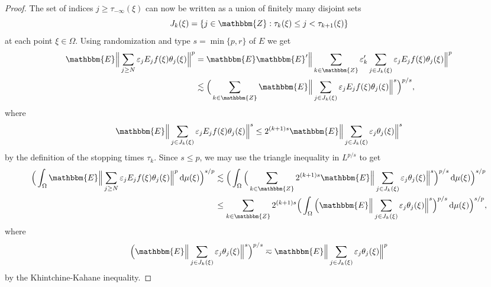 \documentclass[a4paper,10pt]{amsart}
\theoremstyle{plain}
\theoremstyle{definition}
\theoremstyle{remark}
\begin{document}
\begin{proof}
    The set of indices $j\geq\tau_{-\infty}(\xi)$ can now be written as a union of finitely many disjoint sets
    \begin{equation*}
      J_k(\xi) = \{ j\in{\mathbbm{Z}} : \tau_k (\xi) \leq j < \tau_{k+1} (\xi) \}
    \end{equation*} 
    at each point $\xi\in\Omega$.
    Using randomization and type $s = \min \{ p,r \}$ of $E$ we get
    \begin{align*}
      {\mathbbm{E}} \Big\| \sum_{j\geq N} \varepsilon_j E_jf(\xi ) \theta_j(\xi ) \Big\|^p
      &= {\mathbbm{E}} {\mathbbm{E}}' \Big\| \sum_{k\in{\mathbbm{Z}}} \varepsilon_k' \sum_{j\in J_k(\xi)}
        \varepsilon_j E_jf(\xi ) \theta_j(\xi ) \Big\|^p \\
      &\lesssim \Big( \sum_{k\in{\mathbbm{Z}}} {\mathbbm{E}} \Big\| \sum_{j\in J_k(\xi)}
        \varepsilon_j E_jf(\xi ) \theta_j(\xi ) \Big\|^s \Big)^{p/s} ,
    \end{align*}
    where
    \begin{equation*}
      {\mathbbm{E}} \Big\| \sum_{j\in J_k(\xi)}
        \varepsilon_j E_jf(\xi ) \theta_j(\xi ) \Big\|^s
      \leq 2^{(k+1)s} {\mathbbm{E}} \Big\| \sum_{j\in J_k(\xi)}
        \varepsilon_j \theta_j(\xi ) \Big\|^s 
    \end{equation*}
    by the definition of the stopping times $\tau_k$. Since $s\leq p$, we may use the triangle inequality in $L^{p/s}$ to get
    \begin{align*}
      \Big( \int_{\Omega} {\mathbbm{E}} \Big\| \sum_{j\geq N} \varepsilon_j E_jf(\xi) \theta_j (\xi) \Big\|^p {\,\text{d}}\mu (\xi) \Big)^{s/p}
      &\lesssim \Big( \int_{\Omega} \Big( \sum_{k\in{\mathbbm{Z}}} 2^{(k+1)s} 
         {\mathbbm{E}} \Big\| \sum_{j\in J_k(\xi)}
        \varepsilon_j \theta_j(\xi ) \Big\|^s  \Big)^{p/s} {\,\text{d}}\mu (\xi) \Big)^{s/p}\\
      &\leq \sum_{k\in{\mathbbm{Z}}} 2^{(k+1)s} \Big( \int_{\Omega} 
      \Big( {\mathbbm{E}} \Big\| \sum_{j\in J_k(\xi)}
        \varepsilon_j \theta_j(\xi ) \Big\|^s  \Big)^{p/s} {\,\text{d}}\mu (\xi) \Big)^{s/p},
    \end{align*}
    where
    \begin{equation*}
      \Big( {\mathbbm{E}} \Big\| \sum_{j\in J_k(\xi)}
        \varepsilon_j \theta_j(\xi ) \Big\|^s  \Big)^{p/s} \eqsim
      {\mathbbm{E}} \Big\| \sum_{j\in J_k(\xi)}
        \varepsilon_j \theta_j(\xi ) \Big\|^p
    \end{equation*}
    by the Khintchine-Kahane inequality.
    

\end{proof}
\end{document}
